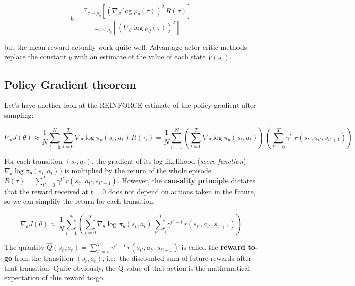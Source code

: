 \documentclass[
  letterpaper,
  DIV=11,
  numbers=noendperiod]{scrreprt}
\begin{document}
\[
    b = \frac{\mathbb{E}_{\tau \sim \rho_\theta}[(\nabla_\theta \log \rho_\theta (\tau))^2 \, R(\tau)]}{\mathbb{E}_{\tau \sim \rho_\theta}[(\nabla_\theta \log \rho_\theta (\tau))^2]}
\]

but the mean reward actually work quite well. Advantage actor-critic
methods replace the constant \(b\) with an estimate of the value of each
state \(\hat{V}(s_t)\).

\hypertarget{policy-gradient-theorem}{%
\subsection{Policy Gradient theorem}\label{policy-gradient-theorem}}

Let's have another look at the REINFORCE estimate of the policy gradient
after sampling:

\[
   \nabla_\theta J(\theta) \approx \frac{1}{N} \sum_{i=1}^N \sum_{t=0}^T \nabla_\theta \log \pi_\theta(s_t, a_t) \, R(\tau_i) = \frac{1}{N} \sum_{i=1}^N (\sum_{t=0}^T \nabla_\theta \log \pi_\theta(s_t, a_t) ) \, (\sum_{t'=0}^T \gamma^{t'} \, r(s_{t'}, a_{t'}, s_{t'+1}) )
\]

For each transition \((s_t, a_t)\), the gradient of its log-likelihood
(\emph{score function}) \(\nabla_\theta \log \pi_\theta(s_t, a_t) )\) is
multiplied by the return of the whole episode
\(R(\tau) = \sum_{t'=0}^T \gamma^{t'} \, r(s_{t'}, a_{t'}, s_{t'+1})\).
However, the \textbf{causality principle} dictates that the reward
received at \(t=0\) does not depend on actions taken in the future, so
we can simplify the return for each transition:

\[
 \nabla_\theta J(\theta) \approx \frac{1}{N} \sum_{i=1}^N (\sum_{t=0}^T \nabla_\theta \log \pi_\theta(s_t, a_t)  \, \sum_{t'=t}^T \gamma^{t'-t} \, r(s_{t'}, a_{t'}, s_{t'+1}) )
\]

The quantity
\(\hat{Q}(s_t, a_t) = \sum_{t'=t}^T \gamma^{t'-t} \, r(s_{t'}, a_{t'}, s_{t'+1})\)
is called the \textbf{reward to-go} from the transition \((s_t, a_t)\),
i.e.~the discounted sum of future rewards after that transition. Quite
obviously, the Q-value of that action is the mathematical expectation of
this reward to-go.
\end{document}
